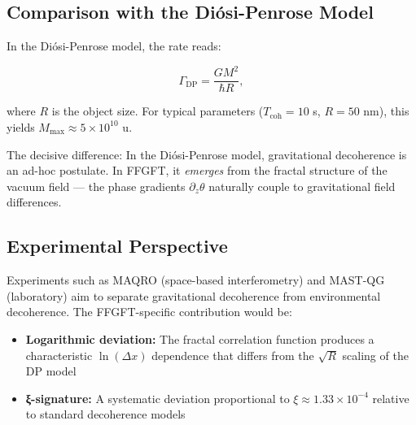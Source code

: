	\subsection*{Comparison with the Diósi-Penrose Model}
	
	In the Diósi-Penrose model, the rate reads:
	
	\begin{equation}
		\Gamma_{\text{DP}} = \frac{G M^2}{\hbar R},
	\end{equation}
	
	where \(R\) is the object size. For typical parameters (\(T_{\text{coh}} = 10\) s, \(R = 50\) nm), this yields \(M_{\max} \approx 5 \times 10^{10}\) u.
	
	\begin{center}
		\small
	\end{center}
	
	The decisive difference: In the Diósi-Penrose model, gravitational decoherence is an ad-hoc postulate. In FFGFT, it \emph{emerges} from the fractal structure of the vacuum field — the phase gradients \(\partial_z \theta\) naturally couple to gravitational field differences.
	
	\subsection*{Experimental Perspective}
	
	Experiments such as MAQRO (space-based interferometry) and MAST-QG (laboratory) aim to separate gravitational decoherence from environmental decoherence. The FFGFT-specific contribution would be:
	
	\begin{itemize}
		\item \textbf{Logarithmic deviation:} The fractal correlation function produces a characteristic \(\ln(\Delta x)\) dependence that differs from the \(\sqrt{R}\) scaling of the DP model
		\item \textbf{ξ-signature:} A systematic deviation proportional to \(\xi \approx 1.33 \times 10^{-4}\) relative to standard decoherence models
	\end{itemize}
	
